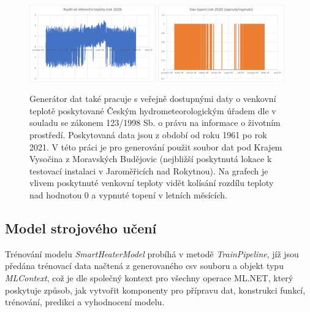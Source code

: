 \pagebreak

\begin{figure}[hbt]
\centering
\includegraphics[width=0.485\textwidth]{obrazky-figures/mlgen_3.png}
\includegraphics[width=0.485\textwidth]{obrazky-figures/mlgen_4.png}
\caption{Generátor dat také pracuje s veřejně dostupnými daty o venkovní teplotě  poskytované Českým hydrometeorologickým úřadem dle \cite{ml-chmu-data} v souladu se zákonem 123/1998 Sb. o právu na informace o životním prostředí. Poskytovaná data jsou z období od roku 1961 po rok 2021. V této práci je pro generování použit soubor dat pod Krajem Vysočina z Moravských Budějovic (nejbližší poskytnutá lokace k testovací instalaci v Jaroměřicích nad Rokytnou). Na grafech je vlivem poskytnuté venkovní teploty vidět kolísání rozdílu teploty nad hodnotou 0 a vypnuté topení v letních měsících.}
\end{figure}


\subsection{Model strojového učení}
Trénování modelu {\it SmartHeaterModel} probíhá v metodě {\it TrainPipeline}, jíž jsou předána trénovací data načtená z generovaného csv souboru a objekt typu {\it MLContext}, což je dle \cite{mlnet_context} společný kontext pro všechny operace ML.NET, který poskytuje způsob, jak vytvořit komponenty pro přípravu dat, konstrukci funkcí, trénování, predikci a vyhodnocení modelu.

